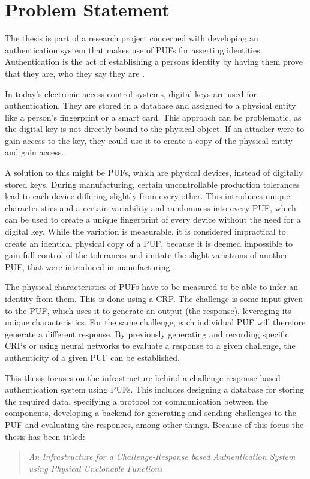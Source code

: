 \section{Problem Statement}

The thesis is part of a research project concerned with developing an authentication system
that makes use of \acp{PUF} for asserting identities.
Authentication is the act of establishing a persons identity by having them prove
that they are, who they say they are \cite[cp.][p. 398]{Basavala2012}.

In today's electronic access control systems, digital keys are used for authentication.
They are stored in a database and assigned to a physical entity like a person's
fingerprint or a smart card.
This approach can be problematic, as the digital key is not directly bound to
the physical object. If an attacker were to gain access to the key,
they could use it to create a copy of the physical entity
and gain access. \cite[cp.][p. 81]{Gao2020}

A solution to this might be \acp{PUF}, which are physical devices, instead of 
digitally stored keys.
During manufacturing, certain uncontrollable production tolerances lead to
each device differing slightly from every other.
This introduces unique characteristics and a certain variability and randomness into every \ac{PUF}, 
which can be used to create a unique fingerprint of every device without the need for a digital key.
While the variation is measurable, it is considered impractical to create an identical physical copy of 
a \ac{PUF}, because it is deemed impossible to gain full control of the
tolerances and imitate the slight variations of another \ac{PUF}, that were introduced in manufacturing. \cite[cp.][p. 81]{Gao2020}

The physical characteristics of \acp{PUF} have to be measured to be able to infer an identity from them.
This is done using a \ac{CRP}. The challenge is some input given to the \ac{PUF}, which uses it to generate an output (the response),
leveraging its unique characteristics. For the same challenge, each individual \ac{PUF} will therefore generate a different response.
By previously generating and recording specific \acp{CRP} or using neural networks to evaluate a response to a
given challenge, the authenticity of a given \ac{PUF} can be established. \cite[cp.][p. 81]{Gao2020}

This thesis focuses on the infrastructure behind a challenge-response based authentication system using \acp{PUF}.
This includes designing a database for storing the required data, specifying a protocol for
communication between the components, developing a backend for generating and sending challenges to the \ac{PUF}
and evaluating the responses, among other things.
Because of this focus the thesis has been titled:
\begin{quote}\begin{center}\emph{An Infrastructure for a Challenge-Response based Authentication System
using Physical Unclonable Functions}\end{center}\end{quote}

